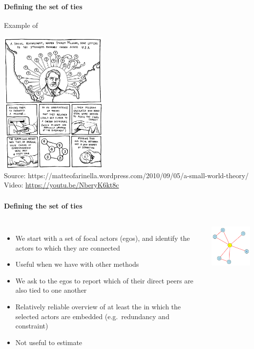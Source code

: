 \documentclass[8pt]{beamer}
\begin{document}
\begin{frame}
\frametitle{\insertsection}
\framesubtitle{Defining the set of ties}

\centering
Example of {\color{blue}{snowball-network method}}

\includegraphics[width=0.4\textwidth]{milgram}\\
\tiny{Source: https://matteofarinella.wordpress.com/2010/09/05/a-small-world-theory/}\\
\tiny{Video: \url{https://youtu.be/NberyK6kt8c}}

\end{frame}



\begin{frame}
\frametitle{\insertsection}
\framesubtitle{Defining the set of ties}


\begin{columns}[c]
{\color{blue}{Ego-centric method}}
\begin{itemize}
\item  We start with a set of focal actors (egos), and identify the actors to which they are connected
\item Useful when we have {\color{dkgreen}{feasibility issues}} with other methods
\item We ask to the egos to report which of their direct peers are also tied to one another 
\item Relatively reliable overview of at least the {\color{dkgreen}{local neighbourhoods}} in which the selected actors are embedded (e.g.\ redundancy and constraint)
\item Not useful to estimate {\color{red}{network-level measures}}
\end{itemize}

\centering
\includegraphics[width=4cm]{egomet}
\end{columns}

\end{frame}
\end{document}
